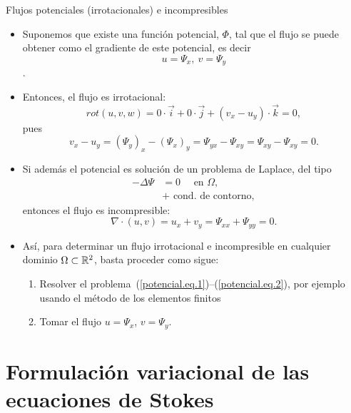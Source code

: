 \documentclass[8pt]{beamer}
\begin{document}
\begin{frame}{Flujos potenciales (irrotacionales) e incompresibles}
\begin{itemize}
\item Suponemos que existe una función potencial, $\Phi$, tal que
  el flujo se puede obtener como el gradiente de este potencial, es decir
  $$u=\Psi_x, \ v=\Psi_y$$.
  \item Entonces, el flujo es \alert{irrotacional}:
  $$
  rot(u,v,w) = 0\cdot \vec{i} + 0\cdot \vec j + (v_x - u_y)\cdot \vec k = 0,
  $$
  pues
  $$
  v_x - u_y= (\Psi_{y})_x - (\Psi_{x})_y = \Psi_{yx} - \Psi_{xy}= \Psi_{xy} - \Psi_{xy} =  0.
  $$
\item Si además el potencial es solución de un problema de Laplace, del tipo
  \begin{align}
    \label{potencial.eq.1}
    -\Delta \Psi &= 0 \quad \text{ en } \Omega, \\
    \label{potencial.eq.2}
    &+ \text{ cond. de contorno},
  \end{align}
  entonces el flujo es \alert{incompresible}:
  $$
  \nabla\cdot(u,v) = u_x + v_y =\Psi_{xx} + \Psi_{yy} =  0.
  $$
\item Así, para determinar un flujo irrotacional e incompresible en
  cualquier dominio $\Omega\subset{\mathbb R}^2$, basta proceder como sigue:
  \begin{enumerate}
  \item Resolver el
    problema~(\ref{potencial.eq.1})--(\ref{potencial.eq.2}), por
    ejemplo usando el método de los elementos finitos
  \item Tomar el flujo $u=\Psi_x$, $v=\Psi_y$.
  \end{enumerate}


\end{itemize}

\end{frame}

\section{Formulación variacional de las ecuaciones de Stokes}
\end{document}
